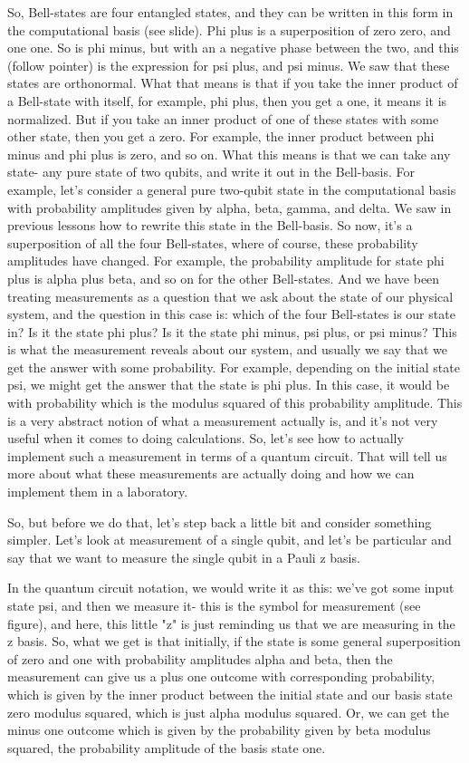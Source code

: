 So, Bell-states are four entangled states, and they can be written in this form in the computational basis (see slide). Phi plus is a superposition of zero zero, and one one. So is phi minus, but with an a negative phase between the two, and this (follow pointer) is the expression for psi plus, and psi minus. We saw that these states are orthonormal. What that means is that if you take the inner product of a Bell-state with itself, for example, phi plus, then you get a one, it means it is normalized. But if you take an inner product of one of these states with some other state, then you get a zero. For example, the inner product between phi minus and phi plus is zero, and so on. What this means is that we can take any state- any pure state of two qubits, and write it out in the Bell-basis. For example, let's consider a general pure two-qubit state in the computational basis with probability amplitudes given by alpha, beta, gamma, and delta. We saw in previous lessons how to rewrite this state in the Bell-basis. So now, it's a superposition of all the four Bell-states, where of course, these probability amplitudes have changed. For example, the probability amplitude for state phi plus is alpha plus beta, and so on for the other Bell-states. And we have been treating measurements as a question that we ask about the state of our physical system, and the question in this case is: which of the four Bell-states is our state in? Is it the state phi plus? Is it the state phi minus, psi plus, or psi minus? This is what the measurement reveals about our system, and usually we say that we get the answer with some probability. For example, depending on the initial state psi, we might get the answer that the state is phi plus. In this case, it would be with probability which is the modulus squared of this probability amplitude. This is a very abstract notion of what a measurement actually is, and it's not very useful when it comes to doing calculations. So, let's see how to actually implement such a measurement in terms of a quantum circuit. That will tell us more about what these measurements are actually doing and how we can implement them in a laboratory.

So, but before we do that, let's step back a little bit and consider something simpler. Let's look at measurement of a single qubit, and let's be particular and say that we want to measure the single qubit in a Pauli z basis.

In the quantum circuit notation, we would write it as this: we've got some input state psi, and then we measure it- this is the symbol for measurement (see figure), and here, this little "z" is just reminding us that we are measuring in the z basis. So, what we get is that initially, if the state is some general superposition of zero and one with probability amplitudes alpha and beta, then the measurement can give us a plus one outcome with corresponding probability, which is given by the inner product between the initial state and our basis state zero modulus squared, which is just alpha modulus squared. Or, we can get the minus one outcome which is given by the probability given by beta modulus squared, the probability amplitude of the basis state one.

